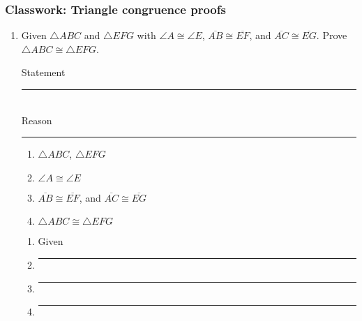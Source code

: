 \documentclass[12pt, oneside]{article}
\begin{document}
\subsubsection*{Classwork: Triangle congruence proofs}
 \begin{enumerate}

  \item Given $\triangle ABC$ and $\triangle EFG$ with $\angle A \cong \angle E$, $\overline{AB} \cong \overline{EF}$, and $\overline{AC} \cong \overline{EG}$. Prove $\triangle ABC \cong \triangle EFG$.\\[0.5cm]
    \begin{multicols}{2}
      Statement \\ \rule{4cm}{0.15mm}\\
      Reason \\ \rule{4cm}{0.15mm}
    \end{multicols}
    \begin{multicols}{2}
      \begin{enumerate}
        \item $\triangle ABC$, $\triangle EFG$ %
        \item $\angle A \cong \angle E$ %
        \item $\overline{AB} \cong \overline{EF}$, and $\overline{AC} \cong \overline{EG}$ %
        \item $\triangle ABC \cong \triangle EFG$ \\
      \end{enumerate}
      \begin{enumerate}
        \item Given
        \item \rule{4cm}{0.15mm}
        \item \rule{4cm}{0.15mm}
        \item \rule{4cm}{0.15mm}
      \end{enumerate}
    \end{multicols}


\end{enumerate}
\end{document}
